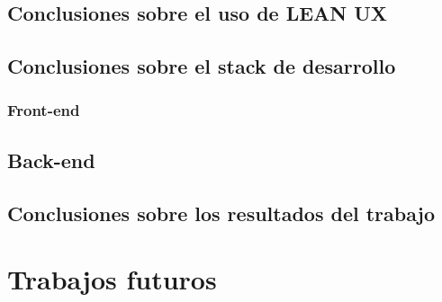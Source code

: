 \subsection{Conclusiones sobre el uso de LEAN UX}

\subsection{Conclusiones sobre el stack de desarrollo}

\subsubsection{Front-end}



\subsection{Back-end}


\subsection{Conclusiones sobre los resultados del trabajo}

\section{Trabajos futuros}




